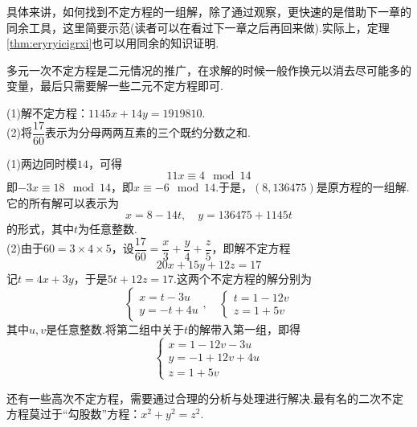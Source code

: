 \documentclass[lang=cn, zihao=5]{elegantbook}
\begin{document}
具体来讲，如何找到不定方程的一组解，除了通过观察，更快速的是借助下一章的同余工具，这里简要示范(读者可以在看过下一章之后再回来做).实际上，定理\ref{thm:eryryicigrxi}也可以用同余的知识证明.

多元一次不定方程是二元情况的推广，在求解的时候一般作换元以消去尽可能多的变量，最后只需要解一些二元不定方程即可.

\begin{example}
	(1)解不定方程：$1145x+14y=1919810$. \\
	(2)将$\dfrac{17}{60}$表示为分母两两互素的三个既约分数之和.
\end{example}
\begin{solution}
	(1)两边同时模$14$，可得$$11x \equiv 4 \mod 14$$
	即$-3x \equiv 18 \mod 14$，即$x \equiv -6 \mod 14$.于是，$(8,136475)$是原方程的一组解.它的所有解可以表示为$$x=8-14t,\quad y=136475+1145t$$
	的形式，其中$t$为任意整数. \\
	(2)由于$60=3 \times 4 \times 5$，设$\dfrac{17}{60} = \dfrac{x}{3} + \dfrac{y}{4} + \dfrac{z}{5}$，即解不定方程$$20x+15y+12z=17$$
	记$t=4x+3y$，于是$5t+12z=17$.这两个不定方程的解分别为$$\begin{cases}
		x=t-3u \\ y=-t+4u
	\end{cases}, \quad \begin{cases}
		t=1-12v \\ z=1+5v
	\end{cases}$$
	其中$u,v$是任意整数.将第二组中关于$t$的解带入第一组，即得$$\begin{cases}
		x=1-12v-3u \\ y=-1+12v+4u \\ z=1+5v
	\end{cases}$$
\end{solution}

还有一些高次不定方程，需要通过合理的分析与处理进行解决.最有名的二次不定方程莫过于“勾股数”方程：$x^2+y^2=z^2$.
\end{document}
